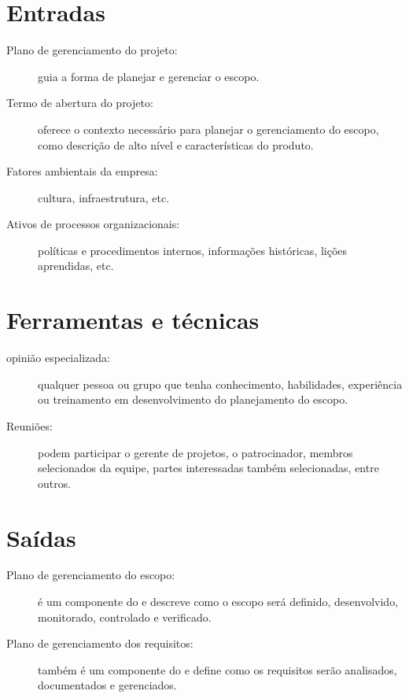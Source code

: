 \section{Entradas}

\begin{description}
	
	\item[Plano de gerenciamento do projeto:] guia a forma de planejar e gerenciar o escopo.

	\item[Termo de abertura do projeto:] oferece o contexto necessário para planejar o gerenciamento do escopo, como descrição de alto nível e características do produto.

	\item[Fatores ambientais da empresa:] cultura, infraestrutura, etc.

	\item[Ativos de processos organizacionais:] políticas e procedimentos internos, informações históricas, lições aprendidas, etc.

\end{description}

\section{Ferramentas e técnicas}

\begin{description}

	\item[opinião especializada:] qualquer pessoa ou grupo que tenha conhecimento, habilidades, experiência ou treinamento em desenvolvimento do planejamento do escopo.

	\item[Reuniões:] podem participar o gerente de projetos, o patrocinador, membros selecionados da equipe, partes interessadas também selecionadas, entre outros.
	
\end{description}

\section{Saídas}

\begin{description}
	
	\item[Plano de gerenciamento do escopo:] é um componente do \planproj e descreve como o escopo será definido, desenvolvido, monitorado, controlado e verificado.

	\item[Plano de gerenciamento dos requisitos:] também é um componente do \planproj e define como os requisitos serão analisados, documentados e gerenciados.
	
\end{description}

